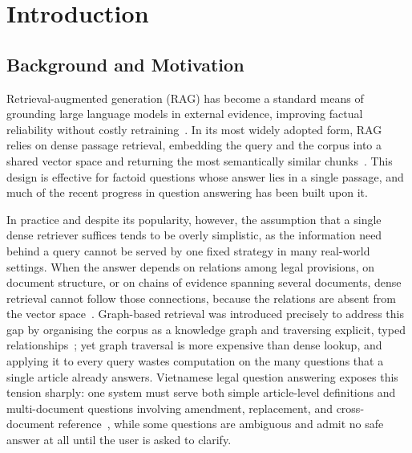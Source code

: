 \documentclass[pdflatex,sn-mathphys-num]{sn-jnl}
\begin{document}

\maketitle

\section{Introduction}\label{sec:intro}

\subsection{Background and Motivation}\label{subsec:background}

Retrieval-augmented generation (RAG) has become a standard means of grounding
large language models in external evidence, improving factual reliability
without costly retraining~\cite{lewis2020rag,guu2020realm}. In its most widely
adopted form, RAG relies on dense passage retrieval, embedding the query and
the corpus into a shared vector space and returning the most semantically
similar chunks~\cite{karpukhin2020dpr}. This design is effective for factoid
questions whose answer lies in a single passage, and much of the recent
progress in question answering has been built upon it.

In practice and despite its popularity, however, the assumption that a single
dense retriever suffices tends to be overly simplistic, as the information
need behind a query cannot be served by one fixed strategy in many real-world
settings. When the answer depends on relations among legal provisions, on
document structure, or on chains of evidence spanning several documents, dense
retrieval cannot follow those connections, because the relations are absent
from the vector space~\cite{trivedi2023interleaving}. Graph-based retrieval
was introduced precisely to address this gap by organising the corpus as a
knowledge graph and traversing explicit, typed
relationships~\cite{edge2024graphrag,wang2024kgp,gutierrez2024hipporag}; yet
graph traversal is more expensive than dense lookup, and applying it to every
query wastes computation on the many questions that a single article already
answers. Vietnamese legal question answering exposes this tension sharply: one
system must serve both simple article-level definitions and multi-document
questions involving amendment, replacement, and cross-document
reference~\cite{chalkidis2020legalbert,zhong2020nlp_law,sovrano2020legalkg},
while some questions are ambiguous and admit no safe answer at all until the
user is asked to clarify.
\end{document}
